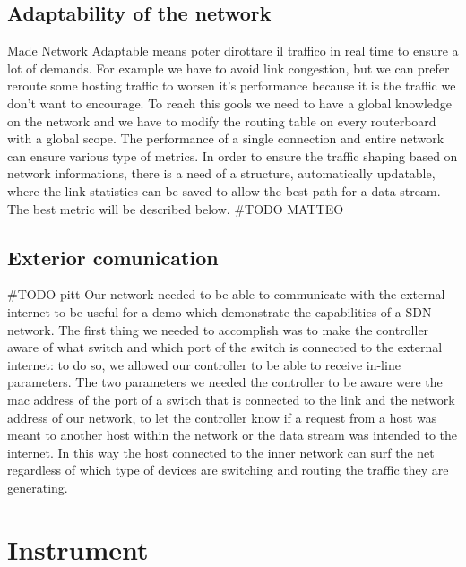\documentclass[conference,10pt]{IEEEtran}
\begin{document}
  \subsection{Adaptability of the network}
  Made Network Adaptable means poter dirottare il traffico in real time to ensure a lot of demands. For example we have to avoid link congestion,
  but we can prefer reroute some hosting traffic to worsen it's performance because  it is the traffic we don't want to encourage.
  To reach this gools we need to have a global knowledge on the network and we have to modify the routing table on every routerboard with a
  global scope.
  The performance of a single connection and entire network can ensure various type of metrics.
  In order to ensure the traffic shaping based on network informations, there is a need of a structure, 
  automatically updatable, where the link statistics can be saved to allow the best path for a data stream. The best metric will be described below.
  \#TODO MATTEO
  \subsection{Exterior comunication}
  \#TODO pitt
	Our network needed to be able to communicate with the external internet to be useful for a demo which demonstrate the capabilities of a SDN network.
	The first thing we needed to accomplish was to make the controller aware of what switch and which port of the switch is connected to the external internet:
	to do so, we allowed our controller to be able to receive in-line parameters. The two parameters we needed the controller to be aware were the mac address of the
	port of a switch that is connected to the link and the network address of our network, to let the controller know if a request from a host was meant to another host
	within the network or the data stream was intended to the internet.
	In this way the host connected to the inner network can surf the net regardless of which type of devices are switching and routing the traffic they are generating.


\section{Instrument}\label{sec:instrument}
\end{document}
